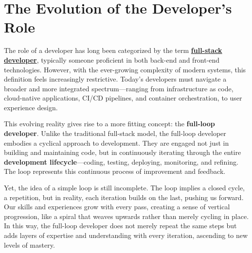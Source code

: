 \documentclass[../../main.tex]{subfiles}
\begin{document}
    \section{The Evolution of the Developer's Role}

        The role of a developer has long been categorized by the term \href{https://www.techopedia.com/definition/33989/full-stack-developer}{\textbf{full-stack developer}}, typically someone proficient in both back-end and front-end technologies. However, with the ever-growing complexity of modern systems, this definition feels increasingly restrictive. Today's developers must navigate a broader and more integrated spectrum—ranging from infrastructure as code, cloud-native applications, CI/CD pipelines, and container orchestration, to user experience design.

        This evolving reality gives rise to a more fitting concept: the \textbf{full-loop developer}. Unlike the traditional full-stack model, the full-loop developer embodies a cyclical approach to development. They are engaged not just in building and maintaining code, but in continuously iterating through the entire \textbf{development lifecycle}—coding, testing, deploying, monitoring, and refining. The loop represents this continuous process of improvement and feedback.

        Yet, the idea of a simple loop is still incomplete. The loop implies a closed cycle, a repetition, but in reality, each iteration builds on the last, pushing us forward. Our skills and experiences grow with every pass, creating a sense of vertical progression, like a spiral that weaves upwards rather than merely cycling in place. In this way, the full-loop developer does not merely repeat the same steps but adds layers of expertise and understanding with every iteration, ascending to new levels of mastery.

\end{document}

